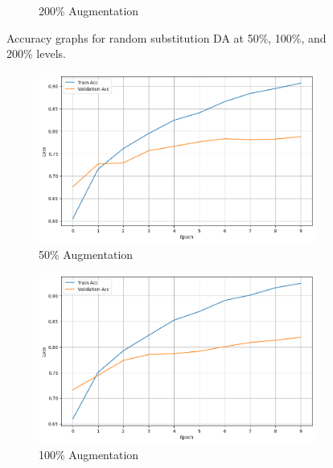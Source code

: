 \documentclass{article}
\begin{document}
\begin{figure}[ht]
\begin{subfigure}[b]{0.3\textwidth}
    \caption{200\% Augmentation}
    \label{fig:random_100}
  \end{subfigure}
  \caption{Accuracy graphs for random substitution DA at 50\%, 100\%, and 200\% levels.}
  \label{fig:random_extreme_substitution_acc}
\end{figure}

\begin{figure}[ht]
  \centering
  \begin{subfigure}[b]{0.3\textwidth}
    \includegraphics[width=\textwidth]{img/synonym_50.png}
    \caption{50\% Augmentation}
    \label{fig:synonym_50}
  \end{subfigure}
  \hfill
  \begin{subfigure}[b]{0.3\textwidth}
    \includegraphics[width=\textwidth]{img/synonym_100.png}
    \caption{100\% Augmentation}
    \label{fig:synonym_100}
  \end{subfigure}
  \hfill
  \begin{subfigure}[b]{0.3\textwidth}

\end{subfigure}
\end{figure}
\end{document}

